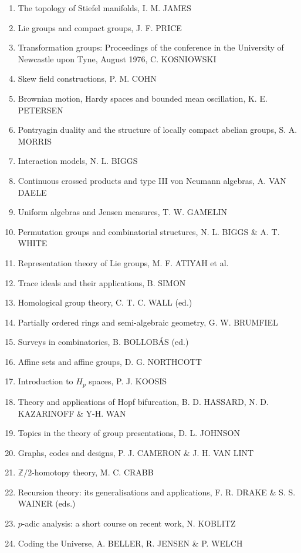 \begin{enumerate}[leftmargin=2.5em,itemsep=2pt,parsep=0pt]
\item[24.] The topology of Stiefel manifolds, I. M. JAMES
\item[25.] Lie groups and compact groups, J. F. PRICE
\item[26.] Transformation groups: Proceedings of the conference in the University of Newcastle upon Tyne, August 1976, C. KOSNIOWSKI
\item[27.] Skew field constructions, P. M. COHN
\item[28.] Brownian motion, Hardy spaces and bounded mean oscillation, K. E. PETERSEN
\item[29.] Pontryagin duality and the structure of locally compact abelian groups, S. A. MORRIS
\item[30.] Interaction models, N. L. BIGGS
\item[31.] Continuous crossed products and type III von Neumann algebras, A. VAN DAELE
\item[32.] Uniform algebras and Jensen measures, T. W. GAMELIN
\item[33.] Permutation groups and combinatorial structures, N. L. BIGGS \& A. T. WHITE
\item[34.] Representation theory of Lie groups, M. F. ATIYAH et al.
\item[35.] Trace ideals and their applications, B. SIMON
\item[36.] Homological group theory, C. T. C. WALL (ed.)
\item[37.] Partially ordered rings and semi-algebraic geometry, G. W. BRUMFIEL
\item[38.] Surveys in combinatorics, B. BOLLOB\'AS (ed.)
\item[39.] Affine sets and affine groups, D. G. NORTHCOTT
\item[40.] Introduction to $H_p$ spaces, P. J. KOOSIS
\item[41.] Theory and applications of Hopf bifurcation, B. D. HASSARD, N. D. KAZARINOFF \& Y-H. WAN
\item[42.] Topics in the theory of group presentations, D. L. JOHNSON
\item[43.] Graphs, codes and designs, P. J. CAMERON \& J. H. VAN LINT
\item[44.] $\mathbb{Z}/2$-homotopy theory, M. C. CRABB
\item[45.] Recursion theory: its generalisations and applications, F. R. DRAKE \& S. S. WAINER (eds.)
\item[46.] $p$-adic analysis: a short course on recent work, N. KOBLITZ
\item[47.] Coding the Universe, A. BELLER, R. JENSEN \& P. WELCH

\end{enumerate}
